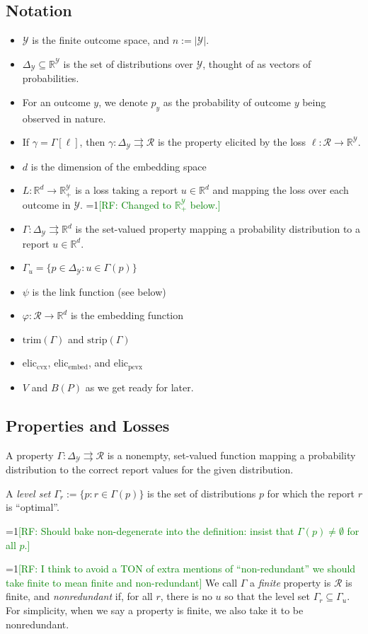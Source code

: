 \documentclass[anon,12pt]{colt2019}
\newcommand{\Comments}{1}
\newcommand{\mynote}[2]{\ifnum\Comments=1\textcolor{#1}{#2}\fi}
\newcommand{\raf}[1]{\mynote{green}{[RF: #1]}}
\newcommand{\reals}{\mathbb{R}}
\newcommand{\prop}[1]{\Gamma[#1]}
\newcommand{\eliccvx}{\mathrm{elic}_\mathrm{cvx}}
\newcommand{\elicpoly}{\mathrm{elic}_\mathrm{pcvx}}
\newcommand{\elicembed}{\mathrm{elic}_\mathrm{embed}}
\newcommand{\simplex}{\Delta_\Y}
\newcommand{\R}{\mathcal{R}}
\newcommand{\Y}{\mathcal{Y}}
\newcommand{\toto}{\rightrightarrows}
\newcommand{\strip}{\mathrm{strip}}
\newcommand{\trim}{\mathrm{trim}}
\begin{document}
\subsection{Notation}
\begin{itemize}
  \item $\Y$ is the finite outcome space, and $n := |\Y|$.
  \item $\simplex\subseteq\reals^\Y$ is the set of distributions over $\Y$, thought of as vectors of probabilities.
  \item For an outcome $y$, we denote $p_y$ as the probability of outcome $y$ being observed in nature.
  \item If $\gamma = \prop{\ell}$, then $\gamma:\simplex \toto \R$ is the property elicited by the loss $\ell: \R \to \reals^\Y$.
  \item $d$ is the dimension of the embedding space
  \item $L:\reals^d \to \reals^\Y_+$ is a loss taking a report $u \in \reals^d$ and mapping the loss over each outcome in $\Y$. \raf{Changed to $\reals^\Y_+$ below.}
  \item $\Gamma: \simplex \toto \reals^d$ is the set-valued property mapping a probability distribution to a report $u \in \reals^d$.
  \item $\Gamma_u = \{ p \in \simplex : u \in \Gamma(p) \}$
  \item $\psi$ is the link function (see below)
  \item $\varphi:\R \to \reals^d$ is the embedding function
  \item $\trim(\Gamma)$ and $\strip(\Gamma)$
  \item $\eliccvx$, $\elicembed$, and $\elicpoly$
  \item $V$ and $B(P)$ as we get ready for later.
\end{itemize}

\subsection{Properties and Losses}
\begin{definition}
  A property $\Gamma:\simplex\toto\R$ is a nonempty, set-valued function mapping a probability distribution to the correct report values for the given distribution.

  A \emph{level set} $\Gamma_r := \{p : r \in \Gamma(p)\}$ is the set of distributions $p$ for which the report $r$ is ``optimal''.

\raf{Should bake non-degenerate into the definition: insist that $\Gamma(p) \neq \emptyset$ for all $p$.}

  \raf{I think to avoid a TON of extra mentions of ``non-redundant'' we should take finite to mean finite and non-redundant}
  We call $\Gamma$ a \emph{finite} property is $\R$ is finite, and \emph{nonredundant} if, for all $r$, there is no $u$ so that the level set $\Gamma_r \subseteq \Gamma_u$.
  For simplicity, when we say a property is finite, we also take it to be nonredundant.
\end{definition}
\end{document}

